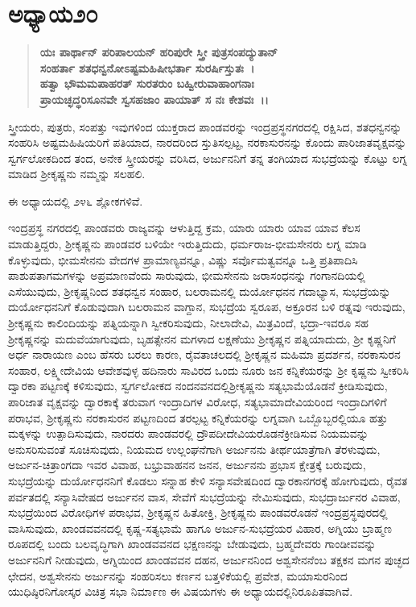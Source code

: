 \section*{ಅಧ್ಯಾಯ\enginline{-}೨೦}

\begin{verse}
\textbf{ಯಃ ಪಾರ್ಥಾನ್ ಪರಿಪಾಲಯನ್ ಹರಿಪುರೇ ಸ್ತ್ರೀ ಪುತ್ರಸಂಪದ್ಯುತಾನ್}\\\textbf{ಸಂಹರ್ತಾ ಶತಧನ್ವನೋಽಷ್ಟಮಹಿಷೀಭರ್ತಾ ಸುರರ್ಷಿಸ್ತುತಃ~।}\\\textbf{ಹತ್ವಾ ಭೌಮಮಪಾಹರತ್ ಸುರತರುಂ ಬಹ್ವೀರುವಾಹಾಂಗನಾಃ }\\\textbf{ಪ್ರಾಯಚ್ಛದ್ಧರಿಸೂನವೇ ಸ್ವಸಹಜಾಂ ಪಾಯಾತ್ ಸ ನಃ ಕೇಶವಃ~।।}
\end{verse}

 ಸ್ತ್ರೀಯರು, ಪುತ್ರರು, ಸಂಪತ್ತು ಇವುಗಳಿಂದ ಯುಕ್ತರಾದ ಪಾಂಡವರನ್ನು ಇಂದ್ರಪ್ರಸ್ಥನಗರದಲ್ಲಿ ರಕ್ಷಿಸಿದ, ಶತಧನ್ವನನ್ನು ಸಂಹರಿಸಿ ಅಷ್ಟಮಹಿಷಿಯರಿಗೆ ಪತಿಯಾದ, ನಾರದರಿಂದ ಸ್ತುತಿಸಲ್ಪಟ್ಟ, ನರಕಾಸುರನನ್ನು ಕೊಂದು ಪಾರಿಜಾತವೃಕ್ಷವನ್ನು ಸ್ವರ್ಗಲೋಕದಿಂದ ತಂದ, ಅನೇಕ ಸ್ತ್ರೀಯರನ್ನು ವರಿಸಿದ, ಅರ್ಜುನನಿಗೆ ತನ್ನ ತಂಗಿಯಾದ ಸುಭದ್ರೆಯನ್ನು ಕೊಟ್ಟು ಲಗ್ನ ಮಾಡಿದ ಶ‍್ರೀಕೃಷ್ಣನು ನಮ್ಮನ್ನು ಸಲಹಲಿ.

ಈ ಅಧ್ಯಾಯದಲ್ಲಿ ೨೪೬ ಶ್ಲೋಕಗಳಿವೆ.

ಇಂದ್ರಪ್ರಸ್ಥ ನಗರದಲ್ಲಿ ಪಾಂಡವರು ರಾಜ್ಯವನ್ನು ಆಳುತ್ತಿದ್ದ ಕ್ರಮ, ಯಾರು ಯಾರು ಯಾವ ಯಾವ ಕೆಲಸ ಮಾಡುತ್ತಿದ್ದರು, ಶ‍್ರೀಕೃಷ್ಣನು ಪಾಂಡವರ ಬಳಿಯೇ ಇರುತ್ತಿದುದು, ಧರ್ಮರಾಜ-ಭೀಮಸೇನರು ಲಗ್ನ ಮಾಡಿ ಕೊಳ್ಳುವುದು, ಭೀಮಸೇನನು ವೇದಗಳ ಪ್ರಾಮಾಣ್ಯವನ್ನೂ, ವಿಷ್ಣು ಸರ್ವೊಮತ್ವವನ್ನೂ ಒತ್ತಿ ಪ್ರತಿಪಾದಿಸಿ ಪಾಶುಪತಾಗಮಗಳನ್ನು ಅಪ್ರಮಾಣವೆಂದು ಸಾರುವುದು, ಭೀಮಸೇನನು ಜರಾಸಂಧನನ್ನು ಗಂಗಾನದಿಯಲ್ಲಿ ಎಸೆಯುವುದು, ಶ‍್ರೀಕೃಷ್ಣನಿಂದ ಶತಧನ್ವನ ಸಂಹಾರ, ಬಲರಾಮನಲ್ಲಿ ದುರ್ಯೋಧನನ ಗದಾಭ್ಯಾಸ, ಸುಭದ್ರೆಯನ್ನು ದುರ್ಯೋಧನನಿಗೆ ಕೊಡುವುದಾಗಿ ಬಲರಾಮನ ವಾಗ್ದಾನ, ಸುಭದ್ರೆಯ ಸ್ವರೂಪ, ಅಕ್ರೂರನ ಬಳಿ ರತ್ನವು ಇರುವುದು, ಶ‍್ರೀಕೃಷ್ಣನು ಕಾಲಿಂದಿಯನ್ನು ಪತ್ನಿಯನ್ನಾಗಿ ಸ್ವೀಕರಿಸುವುದು, ನೀಲಾದೇವಿ, ಮಿತ್ರವಿಂದೆ, ಭದ್ರಾ-ಇವರೂ ಸಹ ಶ‍್ರೀಕೃಷ್ಣನನ್ನು ಮದುವೆಯಾಗುವುದು, ಬೃಹತ್ಸೇನನ ಮಗಳಾದ ಲಕ್ಷಣೆಯು ಶ‍್ರೀಕೃಷ್ಣನ ಪತ್ನಿಯಾದುದು, ಶ‍್ರೀ ಕೃಷ್ಣನಿಗೆ ಅರ್ಧ ನಾರಾಯಣ ಎಂಬ ಹೆಸರು ಬರಲು ಕಾರಣ, ರೈವತಾಚಲದಲ್ಲಿ ಶ‍್ರೀಕೃಷ್ಣನ ಮಹಿಮಾ ಪ್ರದರ್ಶನ, ನರಕಾಸುರನ ಸಂಹಾರ, ಲಕ್ಷ್ಮೀದೇವಿಯ ಆವೇಶವುಳ್ಳ ಹದಿನಾರು ಸಾವಿರದ ಒಂದು ನೂರು ಜನ ಕನ್ನಿಕೆಯರನ್ನು ಶ‍್ರೀ ಕೃಷ್ಣನು ಸ್ವೀಕರಿಸಿ ದ್ವಾರಕಾ ಪಟ್ಟಣಕ್ಕೆ ಕಳಿಸುವುದು, ಸ್ವರ್ಗಲೋಕದ ನಂದನವನದಲ್ಲಿ\break ಶ‍್ರೀಕೃಷ್ಣನು ಸತ್ಯಭಾಮೆಯೊಡನೆ ಕ್ರೀಡಿಸುವುದು, ಪಾರಿಜಾತ ವೃಕ್ಷವನ್ನು ದ್ವಾರಕಾಕ್ಕೆ ತರುವಾಗ ಇಂದ್ರಾದಿಗಳ ವಿರೋಧ, ಸತ್ಯಭಾಮಾದೇವಿಯರಿಂದ ಇಂದ್ರಾದಿಗಳಿಗೆ ಪರಾಭವ, ಶ‍್ರೀಕೃಷ್ಣನು ನರಕಾಸುರನ ಪಟ್ಟಣದಿಂದ ತರಲ್ಪಟ್ಟ ಕನ್ನಿಕೆಯರನ್ನು ಲಗ್ನವಾಗಿ ಒಬ್ಬೊಬ್ಬರಲ್ಲಿಯೂ ಹತ್ತು ಮಕ್ಕಳನ್ನು ಉತ್ಪಾದಿಸುವುದು, ನಾರದರು ಪಾಂಡವರಲ್ಲಿ ದ್ರೌಪದೀದೇವಿಯರೊಡನೆ\break ಕ್ರೀಡಿಸುವ ನಿಯಮವನ್ನು ಅನುಸರಿಸುವಂತೆ ಸೂಚಿಸುವುದು, ನಿಯಮದ ಉಲ್ಲಂಘನೆಗಾಗಿ ಅರ್ಜುನನು ತೀರ್ಥಯಾತ್ರೆಗಾಗಿ ತೆರಳುವುದು, ಅರ್ಜುನ-ಚಿತ್ರಾಂಗದಾ ಇವರ ವಿವಾಹ, ಬಭ್ರುವಾಹನನ ಜನನ, ಅರ್ಜುನನು ಪ್ರಭಾಸ ಕ್ಷೇತ್ರಕ್ಕೆ ಬರುವುದು, ಸುಭದ್ರೆಯನ್ನು ದುರ್ಯೋಧನನಿಗೆ ಕೊಡಲು ಸನ್ನಾಹ ಕೇಳಿ ಸನ್ಯಾಸವೇಷದಿಂದ ದ್ವಾರಕಾನಗರಕ್ಕೆ ಹೋಗುವುದು, ರೈವತ ಪರ್ವತದಲ್ಲಿ ಸನ್ಯಾಸಿವೇಷದ ಅರ್ಜುನನ ವಾಸ, ಸೇವೆಗೆ ಸುಭದ್ರೆಯನ್ನು ನೇಮಿಸುವುದು, ಸುಭದ್ರಾರ್ಜುನರ ವಿವಾಹ, ಸುಭದ್ರೆಯಿಂದ ವಿರೋಧಿಗಳ ಪರಾಭವ, ಶ‍್ರೀಕೃಷ್ಣನ ಹಿತೋಕ್ತಿ, ಶ‍್ರೀಕೃಷ್ಣನು ಪಾಂಡವರೊಡನೆ ಇಂದ್ರಪ್ರಸ್ಥಪುರದಲ್ಲಿ ವಾಸಿಸುವುದು, ಖಾಂಡವವನದಲ್ಲಿ ಕೃಷ್ಣ-ಸತ್ಯಭಾಮೆ ಹಾಗೂ ಅರ್ಜುನ-ಸುಭದ್ರೆಯರ ವಿಹಾರ, ಅಗ್ನಿಯು ಬ್ರಾಹ್ಮಣ ರೂಪದಲ್ಲಿ ಬಂದು ಬಲವೃದ್ಧಿಗಾಗಿ ಖಾಂಡವವನದ ಭಕ್ಷಣನನ್ನು ಬೇಡುವುದು, ಬ್ರಹ್ಮದೇವರು ಗಾಂಡೀವವನ್ನು ಅರ್ಜುನನಿಗೆ ನೀಡುವುದು, ಅಗ್ನಿಯಿಂದ ಖಾಂಡವವನ ದಹನ, ಅರ್ಜುನನಿಂದ ಅಶ್ವಸೇನನೆಂಬ ತಕ್ಷಕನ ಮಗನ ಪುಚ್ಛದ ಛೇದನ, ಅಶ್ವಸೇನನು ಅರ್ಜುನನ್ನು ಸಂಹರಿಸಲು ಕರ್ಣನ ಬತ್ತಳಿಕೆಯಲ್ಲಿ ಪ್ರವೇಶ, ಮಯಾಸುರನಿಂದ ಯುಧಿಷ್ಠಿರನಿಗೋಸ್ಕರ ವಿಚಿತ್ರ ಸಭಾ ನಿಮಾ೯ಣ ಈ ವಿಷಯಗಳು ಈ ಅಧ್ಯಾಯದಲ್ಲಿ\break ನಿರೂಪಿತವಾಗಿವೆ.


